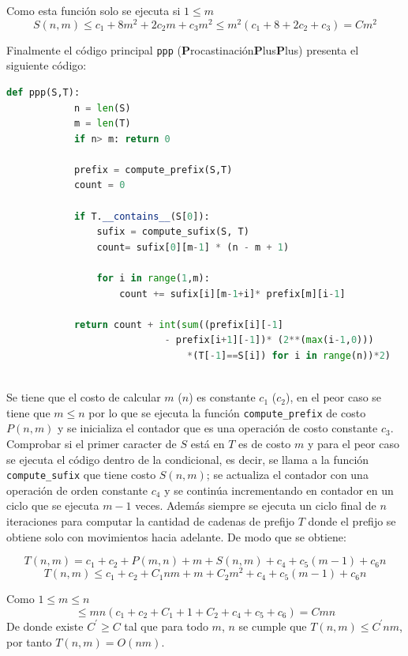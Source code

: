 \documentclass[a4paper]{article}
\begin{document}
    Como esta funci\'on solo se ejecuta si $1\leq m$
    $$S(n,m) \leq c_1 + 8m^2 + 2c_2m + c_3m^2 \leq m^2(c_1 + 8 +2c_2 + c_3) = Cm^2$$

    Finalmente el c\'odigo principal \texttt{ppp} (\textbf{P}rocastinaci\'on\textbf{P}lus\textbf{P}lus) presenta el siguiente c\'odigo:

    \begin{lstlisting}[language=Python]
        def ppp(S,T):
            n = len(S)
            m = len(T)
            if n> m: return 0
        
            prefix = compute_prefix(S,T)
            count = 0
        
            if T.__contains__(S[0]):
                sufix = compute_sufix(S, T)
                count= sufix[0][m-1] * (n - m + 1)
                
                for i in range(1,m):           
                    count += sufix[i][m-1+i]* prefix[m][i-1]
            
            return count + int(sum((prefix[i][-1] 
                            - prefix[i+1][-1])* (2**(max(i-1,0))) 
                                *(T[-1]==S[i]) for i in range(n))*2)
    
    \end{lstlisting}
    Se tiene que el costo de calcular $m$ ($n$) es constante $c_1$ ($c_2$), en el peor caso se tiene que $m \leq n$ por 
    lo que se ejecuta la funci\'on \texttt{compute\_prefix} de costo $P(n,m)$ y se inicializa el contador que es una operaci\'on de costo constante $c_3$.
    Comprobar si el primer caracter de $S$ est\'a en $T$  es de costo  $m$ y para el peor caso se ejecuta el c\'odigo dentro de la condicional, 
    es decir, se llama a la funci\'on \texttt{compute\_sufix} que tiene costo $S(n,m)$; se actualiza el contador con una operaci\'on de orden constante $c_4$ 
    y se contin\'ua incrementando en contador en un ciclo que se ejecuta $m-1$ veces. Adem\'as siempre se ejecuta un ciclo final 
    de $n$ iteraciones para computar la cantidad de cadenas de prefijo $T$ donde el prefijo se obtiene solo con movimientos hacia adelante. De modo que se obtiene: 

    $$ T(n,m) = c_1 + c_2 + P(m,n) + m + S(n,m) + c_4 +c_5(m-1) + c_6n $$
	$$ T(n,m) \leq c_1 + c_2 + C_1nm + m + C_2m^2 + c_4 +c_5(m-1) + c_6n $$

    Como $1 \leq m\leq n$
    $$\leq mn (c_1 + c_2 + C_1 + 1 + C_2 + c_4 +c_5 + c_6) = Cmn $$
    De donde existe $C^{'} \geq C$ tal que para todo $m$, $n$ se cumple que $T(n,m) \leq C^{'}nm$,
    por tanto $T(n,m) = O(nm)$.
\end{document}
